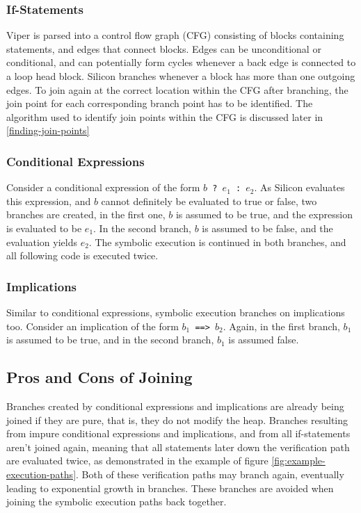 \documentclass[11pt]{article}
\begin{document}
    \subsubsection{If-Statements} \label{if-statements}

    Viper is parsed into a control flow graph (CFG) consisting of blocks containing
    statements, and edges that connect blocks. Edges can be unconditional or conditional,
    and can potentially form cycles whenever a back edge is connected to a loop head block.
    Silicon branches whenever a block has more than one outgoing edges.
    To join again at the correct location within the CFG after branching,
    the join point for each corresponding branch point has to be identified.
    The algorithm used to identify join points within the CFG is discussed later in
    \ref{finding-join-points}

    \subsubsection{Conditional Expressions}

    Consider a conditional expression of the form \texttt{$b$ ? $e_1$ : $e_2$}.
    As Silicon evaluates this expression, and $b$ cannot definitely be evaluated to true or false,
    two branches are created, in the first one, $b$ is assumed to be
    true, and the expression is evaluated to be $e_1$.
    In the second branch, $b$ is assumed to be false, and the evaluation yields $e_2$.
    The symbolic execution is continued in both branches, and all following code
    is executed twice.


    \subsubsection{Implications}

    Similar to conditional expressions, symbolic execution branches on implications too. Consider
    an implication of the form \texttt{$b_1$ ==> $b_2$}. Again, in the first branch, $b_1$ is assumed to be true,
    and in the second branch, $b_1$ is assumed false.

    \subsection{Pros and Cons of Joining}

    Branches created by conditional expressions and implications are already being joined if they are pure,
    that is, they do not modify the heap.
    Branches resulting from impure conditional expressions and implications,
    and from all if-statements aren't joined again, meaning that
    all statements later down the verification path are evaluated twice, as demonstrated
    in the example of figure \ref{fig:example-execution-paths}. Both of these
    verification paths may branch again, eventually leading to exponential growth in branches.
    These branches are avoided when joining the symbolic execution paths back together.
\end{document}
